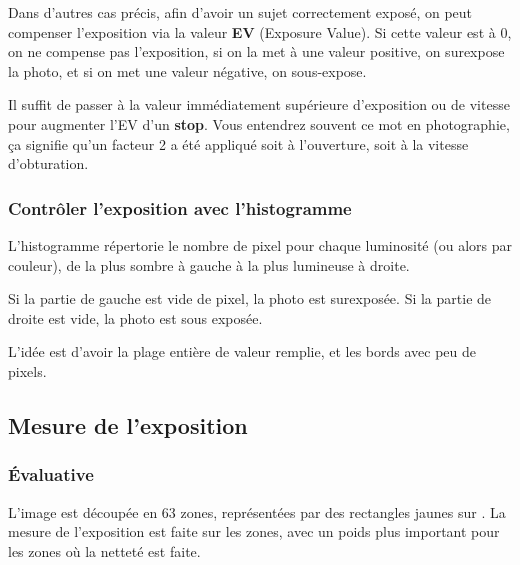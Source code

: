 \documentclass[a4paper,twoside]{article}
\begin{document}
Dans d'autres cas précis, afin d'avoir un sujet correctement exposé, on peut compenser l'exposition via la valeur \textbf{EV} (Exposure Value). Si cette valeur est à 0, on ne compense pas l'exposition, si on la met à une valeur positive, on surexpose la photo, et si on met une valeur négative, on sous-expose. 

Il suffit de passer à la valeur immédiatement supérieure d'exposition ou de vitesse pour augmenter l'EV d'un \textbf{stop}. Vous entendrez souvent ce mot en photographie, ça signifie qu'un facteur 2 a été appliqué soit à l'ouverture, soit à la vitesse d'obturation.

\subsubsection{Contrôler l'exposition avec l'histogramme}
L'histogramme répertorie le nombre de pixel pour chaque luminosité (ou alors par couleur), de la plus sombre à gauche à la plus lumineuse à droite. 

Si la partie de gauche est vide de pixel, la photo est surexposée. Si la partie de droite est vide, la photo est sous exposée. 

L'idée est d'avoir la plage entière de valeur remplie, et les bords avec peu de pixels.

\subsection{Mesure de l'exposition}
\subsubsection{Évaluative}
L'image est découpée en 63 zones, représentées par des rectangles jaunes sur . La mesure de l'exposition est faite sur les zones, avec un poids plus important pour les zones où la netteté est faite. 
\end{document}
